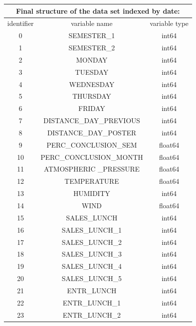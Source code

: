        \begin{table}[!ht]
            \centering
            \begin{tabular}{c|c|c} \hline
                \multicolumn{3}{c}{ Final structure of the data set indexed by date: } \\
                \hline
                identifier &	variable name					&variable type\\ 
                \hline
                0&	SEMESTER\_1					&int64 \\
                1&	SEMESTER\_2					&int64\\
                2&	MONDAY 						&int64 \\
                3&	TUESDAY 						&int64 \\
                4&	WEDNESDAY						&int64 \\ 
                5&	THURSDAY						&int64 \\ 
                6&	FRIDAY						&int64 \\ 
                7&	DISTANCE\_DAY\_PREVIOUS 	&	int64 \\ 
                8&	DISTANCE\_DAY\_POSTER	&	int64 \\
                9&	PERC\_CONCLUSION\_SEM		&	float64 \\
                10&	PERC\_CONCLUSION\_MONTH		&	float64 \\
                11&	ATMOSPHERIC \_PRESSURE 		&	float64 \\
                12&	TEMPERATURE					&float64 \\ 
                13&	HUMIDITY						&int64 \\
                14&	WIND						&float64\\ 
                15&	SALES\_LUNCH				&int64 \\
                16&	SALES\_LUNCH\_1			&	int64 \\ 
                17&	SALES\_LUNCH\_2			&	int64 \\
                18&	SALES\_LUNCH\_3			&	int64\\ 
                19&	SALES\_LUNCH\_4			&	int64 \\
                20&	SALES\_LUNCH\_5			&	int64 \\ 
                21&	ENTR\_LUNCH				&	int64\\
                22&	ENTR\_LUNCH\_1				&int64 \\
                23&	ENTR\_LUNCH\_2				&int64 \\

\end{tabular}
\end{table}

